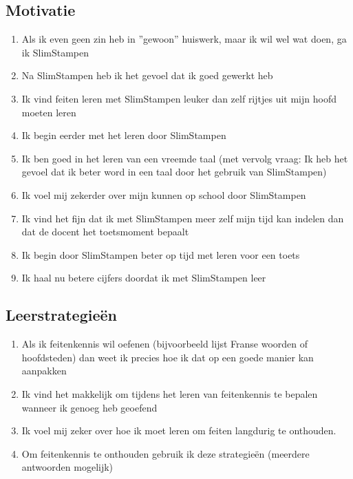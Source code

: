 \documentclass[12pt, a4paper]{article}
\begin{document}
\subsection*{Motivatie}
\begin{enumerate}
    \item Als ik even geen zin heb in ''gewoon'' huiswerk, maar ik wil wel wat doen, ga ik SlimStampen
    \item Na SlimStampen heb ik het gevoel dat ik goed gewerkt heb
    \item Ik vind feiten leren met SlimStampen leuker dan zelf rijtjes uit mijn hoofd moeten leren
    \item Ik begin eerder met het leren door SlimStampen
    \item Ik ben goed in het leren van een vreemde taal (met vervolg vraag: Ik heb het gevoel dat ik beter word in een taal door het gebruik van SlimStampen)
    \item Ik voel mij zekerder over mijn kunnen op school door SlimStampen
    \item Ik vind het fijn dat ik met SlimStampen meer zelf mijn tijd kan indelen dan dat de docent het toetsmoment bepaalt
    \item Ik begin door SlimStampen beter op tijd met leren voor een toets
    \item Ik haal nu betere cijfers doordat ik met SlimStampen leer
\end{enumerate}
\subsection*{Leerstrategieën}
\begin{enumerate}
    \item Als ik feitenkennis wil oefenen (bijvoorbeeld lijst Franse woorden of hoofdsteden) dan weet ik precies hoe ik dat op een goede manier kan aanpakken
    \item Ik vind het makkelijk om tijdens het leren van feitenkennis te bepalen wanneer ik genoeg heb geoefend
    \item Ik voel mij zeker over hoe ik moet leren om feiten langdurig te onthouden.
    \item Om feitenkennis te onthouden gebruik ik deze strategieën (meerdere antwoorden mogelijk)
\end{enumerate}
\end{document}
